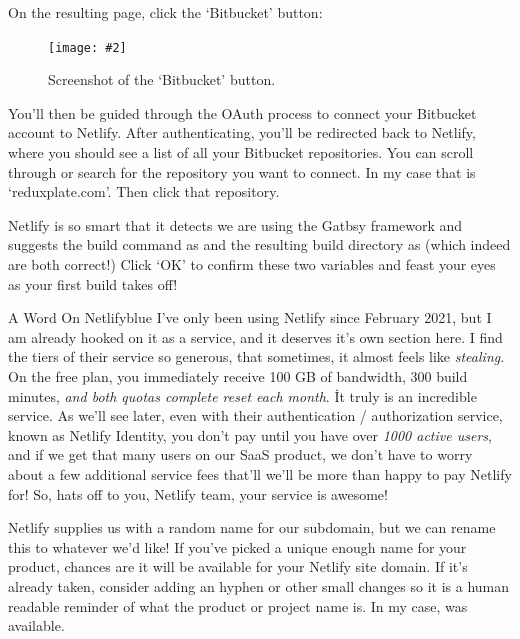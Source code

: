 \documentclass[a4paper,
                             oneside,
                             BCOR1.0cm,
                             DIV11,
                             parskip=full,
                             11pt]{scrbook}
\newcommand{\standardfigure}[3]{\begin{figure}[H]\begin{center}\texttt{[image: \#2]}\caption{#3}\end{center}\end{figure}}
\begin{document}
On the resulting page, click the `Bitbucket' button:

\standardfigure{\textwidth}{frontend/netlify-bitbucket-button}{Screenshot of the `Bitbucket' button.}

You'll then be guided through the OAuth process to connect your Bitbucket account to Netlify. After authenticating, you'll be redirected back to Netlify, where you should see a list of all your Bitbucket repositories. You can scroll through or search for the repository you want to connect. In my case that is `reduxplate.com'. Then click that repository.

Netlify is so smart that it detects we are using the Gatbsy framework and suggests the build command as  and the resulting build directory as \codeword{} (which indeed are both correct!) Click `OK' to confirm these two variables and feast your eyes as your first build takes off!

\begin{highlightBox}{A Word On Netlify}{blue}{\information}
I've only been using Netlify since February 2021, but I am already hooked on it as a service, and it deserves it's own section here. I find the tiers of their service so generous, that sometimes, it almost feels like \textit{stealing}. On the free plan, you immediately receive 100 GB of bandwidth, 300 build minutes, \textit{and both quotas complete reset each month}. \. It truly is an incredible service. 
\newline\newline
As we'll see later, even with their authentication / authorization service, known as Netlify Identity, you don't pay until you have over \textit{1000 active users}, and if we get that many users on our SaaS product, we don't have to worry about a few additional service fees that'll we'll be more than happy to pay Netlify for! \wink
\newline\newline
So, hats off to you, Netlify team, your service is awesome! \thumbsup
\end{highlightBox}


Netlify supplies us with a random name for our subdomain, but we can rename this to whatever we'd like! If you've picked a unique enough name for your product, chances are it will be available for your Netlify site domain. If it's already taken, consider adding an hyphen or other small changes so it is a human readable reminder of what the product or project name is. In my case,  was available. 
\end{document}
